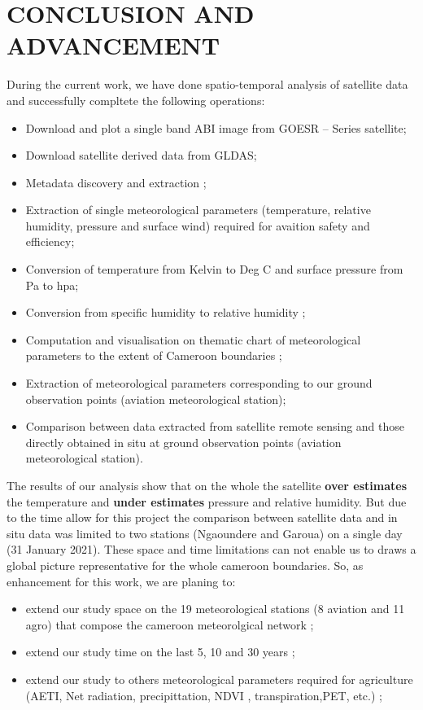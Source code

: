 \chapter*{\normalsize{\textbf{CONCLUSION AND ADVANCEMENT}}}
During the current work, we have done  spatio-temporal analysis of satellite data and successfully compltete the following operations:
\begin{itemize} 
    \item Download and plot a single band ABI image from GOESR – Series satellite;
    \item Download satellite derived data from GLDAS;
    \item Metadata discovery and extraction ;
    \item Extraction of single meteorological parameters (temperature, relative humidity, pressure and surface wind) required for avaition safety and efficiency;
    \item Conversion of temperature from Kelvin to Deg C and   surface pressure from Pa to hpa;
    \item Conversion from specific humidity to relative humidity ;
    \item Computation and visualisation on thematic  chart  of meteorological parameters  to the extent of Cameroon boundaries ;
    \item Extraction of meteorological parameters  corresponding to our ground observation points (aviation meteorological station);
    \item Comparison between data extracted from satellite remote sensing and those directly obtained in situ at ground observation points (aviation meteorological station). 
\end{itemize}
The results of our analysis show that on the whole the satellite \textbf {over estimates} the temperature and \textbf {under estimates} pressure and relative humidity. \newline
But due to the time allow for this project  the comparison between satellite data and in situ data was limited to two stations (Ngaoundere and Garoua) on a single day (31 January 2021). \newline
These space  and time  limitations can not enable us to draws a global picture representative for the whole cameroon boundaries.
So, as enhancement for this work, we are planing to:
\begin{itemize} 
    \item extend our study space on  the 19 meteorological stations (8 aviation and 11 agro) that compose  the cameroon meteorolgical network ;
    \item extend our study time on the last 5, 10 and 30 years ;
    \item extend our study to others meteorological parameters required for agriculture (AETI, Net radiation, precipittation,  NDVI , transpiration,PET, etc.) ;
\end{itemize}
